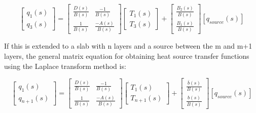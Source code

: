 \begin{equation}
\left[ {\begin{array}{*{20}{c}}{{q_1}\left( s \right)}\\ {{q_3}\left( s \right)}\end{array}} \right] = \left[ {\begin{array}{*{20}{c}}{\frac{{D\left( s \right)}}{{B\left( s \right)}}}&{\frac{{ - 1}}{{B\left( s \right)}}}\\ {\frac{1}{{B\left( s \right)}}}&{\frac{{ - A\left( s \right)}}{{B\left( s \right)}}}\end{array}} \right]\left[ {\begin{array}{*{20}{c}}{{T_1}\left( s \right)}\\ {{T_3}\left( s \right)}\end{array}} \right] + \left[ {\begin{array}{*{20}{c}}{\frac{{{B_2}\left( s \right)}}{{B\left( s \right)}}}\\ {\frac{{{B_1}\left( s \right)}}{{B\left( s \right)}}}\end{array}} \right]\left[ {{q_{source}}\left( s \right)} \right]
\end{equation}

If this is extended to a slab with n layers and a source between the m and m+1 layers, the general matrix equation for obtaining heat source transfer functions using the Laplace transform method is:

\begin{equation}
\left[ {\begin{array}{*{20}{c}}{{q_1}\left( s \right)}\\ {{q_{n + 1}}\left( s \right)}\end{array}} \right] = \left[ {\begin{array}{*{20}{c}}{\frac{{D\left( s \right)}}{{B\left( s \right)}}}&{\frac{{ - 1}}{{B\left( s \right)}}}\\ {\frac{1}{{B\left( s \right)}}}&{\frac{{ - A\left( s \right)}}{{B\left( s \right)}}}\end{array}} \right]\left[ {\begin{array}{*{20}{c}}{{T_1}\left( s \right)}\\ {{T_{n + 1}}\left( s \right)}\end{array}} \right] + \left[ {\begin{array}{*{20}{c}}{\frac{{\bar b\left( s \right)}}{{B\left( s \right)}}}\\ {\frac{{b\left( s \right)}}{{B\left( s \right)}}}\end{array}} \right]\left[ {{q_{source}}\left( s \right)} \right]
\label{eq:LaplaceTransformDeriv652}
\end{equation}


